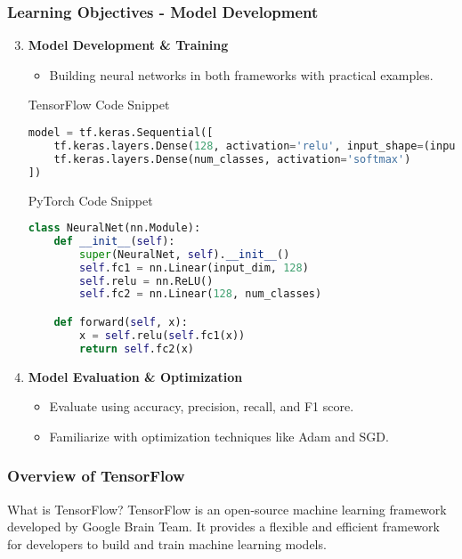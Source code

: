 \documentclass[aspectratio=169]{beamer}
\begin{document}
\begin{frame}[fragile]
    \frametitle{Learning Objectives - Model Development}
    \begin{enumerate}
        \setcounter{enumi}{2}
        \item \textbf{Model Development \& Training}
        \begin{itemize}
            \item Building neural networks in both frameworks with practical examples.
        \end{itemize}
        
        \begin{block}{TensorFlow Code Snippet}
        \begin{lstlisting}[language=Python]
model = tf.keras.Sequential([
    tf.keras.layers.Dense(128, activation='relu', input_shape=(input_dim,)),
    tf.keras.layers.Dense(num_classes, activation='softmax')
])
        \end{lstlisting}
        \end{block}
        
        \begin{block}{PyTorch Code Snippet}
        \begin{lstlisting}[language=Python]
class NeuralNet(nn.Module):
    def __init__(self):
        super(NeuralNet, self).__init__()
        self.fc1 = nn.Linear(input_dim, 128)
        self.relu = nn.ReLU()
        self.fc2 = nn.Linear(128, num_classes)

    def forward(self, x):
        x = self.relu(self.fc1(x))
        return self.fc2(x)
        \end{lstlisting}
        \end{block}

        \item \textbf{Model Evaluation \& Optimization}
        \begin{itemize}
            \item Evaluate using accuracy, precision, recall, and F1 score.
            \item Familiarize with optimization techniques like Adam and SGD.
        \end{itemize}
    \end{enumerate}
\end{frame}

\begin{frame}[fragile]
    \frametitle{Overview of TensorFlow}
    \begin{block}{What is TensorFlow?}
        TensorFlow is an open-source machine learning framework developed by Google Brain Team. It provides a flexible and efficient framework for developers to build and train machine learning models.
    \end{block}
\end{frame}
\end{document}
